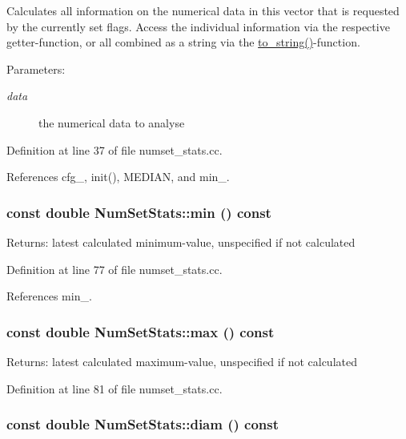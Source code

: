 Calculates all information on the numerical data in this vector that is requested by the currently set flags. Access the individual information via the respective getter-function, or all combined as a string via the \hyperlink{class_num_set_stats_639732de39c31d82ade97d8e204db3c0}{to\_\-string()}-function. \begin{Desc}
\item[Parameters:]
\begin{description}
\item[{\em data}]the numerical data to analyse \end{description}
\end{Desc}


Definition at line 37 of file numset\_\-stats.cc.

References cfg\_\-, init(), MEDIAN, and min\_\-.\hypertarget{class_num_set_stats_a20ab577f51080f3798a825a6392fda2}{
\subsubsection[min]{\setlength{\rightskip}{0pt plus 5cm}const double NumSetStats::min () const}}
\label{class_num_set_stats_a20ab577f51080f3798a825a6392fda2}


\begin{Desc}
\item[Returns:]latest calculated minimum-value, unspecified if not calculated \end{Desc}


Definition at line 77 of file numset\_\-stats.cc.

References min\_\-.\hypertarget{class_num_set_stats_ca1e3149eda7dc53aa884b577f61a12f}{
\subsubsection[max]{\setlength{\rightskip}{0pt plus 5cm}const double NumSetStats::max () const}}
\label{class_num_set_stats_ca1e3149eda7dc53aa884b577f61a12f}


\begin{Desc}
\item[Returns:]latest calculated maximum-value, unspecified if not calculated \end{Desc}


Definition at line 81 of file numset\_\-stats.cc.\hypertarget{class_num_set_stats_36ddcdd2cdc3c01ae0b5253e26f3599e}{
\subsubsection[diam]{\setlength{\rightskip}{0pt plus 5cm}const double NumSetStats::diam () const}}
\label{class_num_set_stats_36ddcdd2cdc3c01ae0b5253e26f3599e}


